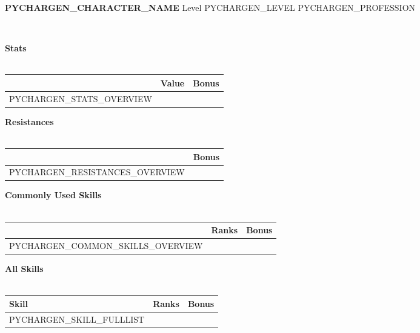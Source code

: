 \documentclass{article}
\newcommand{\secTitle}[1]{
  {\centering \large \bf #1} \\
  \vspace{-1 mm}
  \hrulefill
  \vspace{3 mm}\\
}
\begin{document}
{\LARGE \bf PYCHARGEN_CHARACTER_NAME} {\normalsize Level PYCHARGEN_LEVEL PYCHARGEN_PROFESSION}

\hrulefill
\\

\newcommand{\Stat}[3]{\ifnumequal{\theStatsAdded}{5}{\hline \setcounter{StatsAdded}{0}}{}
                      #1 & #2 & #3 \stepcounter{StatsAdded}\\}

\begin{multicols}{2}
\begin{framed}
\centering
\secTitle{Stats}
\begin{tabular}{r|c|c}
& Value & Bonus \\
\hline
PYCHARGEN_STATS_OVERVIEW
\end{tabular}
\end{framed}

\newcommand{\Resistance}[2]{#1 & #2 \\}

\begin{framed}
\centering
\secTitle{Resistances}
\begin{tabular}{r|c}
  & Bonus \\
\hline
PYCHARGEN_RESISTANCES_OVERVIEW
\end{tabular}
\end{framed}

\newcommand{\CommonSkill}[3]{#1 & #2 & #3 \\}

\begin{framed}
\centering
\secTitle{Commonly Used Skills}
\begin{tabular}{r|c|c}
  & Ranks & Bonus \\
\hline
PYCHARGEN_COMMON_SKILLS_OVERVIEW
\end{tabular}
\end{framed}
\end{multicols}

\clearpage

\newlength{\skIndent}
\setlength{\skIndent}{0.4cm}
\newcommand{\DetailSkill}[4]{\hspace{#4\skIndent} #1 & #2 & #3 \\}

\begin{framed}
\secTitle{All Skills}
\begin{longtable}{lcc}
Skill & Ranks & Bonus \\
\hline
PYCHARGEN_SKILL_FULLLIST
\end{longtable}
\end{framed}
\end{document}
